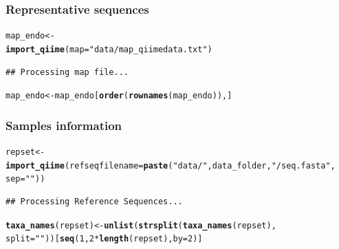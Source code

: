 \documentclass[12pt]{article}\usepackage[]{graphicx}\usepackage[]{color}
\makeatletter
\newcommand{\hlnum}[1]{\textcolor[rgb]{0.686,0.059,0.569}{#1}}%
\newcommand{\hlstr}[1]{\textcolor[rgb]{0.192,0.494,0.8}{#1}}%
\newcommand{\hlopt}[1]{\textcolor[rgb]{0,0,0}{#1}}%
\newcommand{\hlstd}[1]{\textcolor[rgb]{0.345,0.345,0.345}{#1}}%
\newcommand{\hlkwb}[1]{\textcolor[rgb]{0.69,0.353,0.396}{#1}}%
\newcommand{\hlkwc}[1]{\textcolor[rgb]{0.333,0.667,0.333}{#1}}%
\newcommand{\hlkwd}[1]{\textcolor[rgb]{0.737,0.353,0.396}{\textbf{#1}}}%
\newenvironment{kframe}{%
 \def\at@end@of@kframe{}%
 \ifinner\ifhmode%
  \def\at@end@of@kframe{\end{minipage}}%
  \begin{minipage}{\columnwidth}%
 \fi\fi%
 \def\FrameCommand##1{\hskip\@totalleftmargin \hskip-\fboxsep
 \colorbox{shadecolor}{##1}\hskip-\fboxsep
     \hskip-\linewidth \hskip-\@totalleftmargin \hskip\columnwidth}%
 \MakeFramed {\advance\hsize-\width
   \@totalleftmargin\z@ \linewidth\hsize
   \@setminipage}}%
 {\par\unskip\endMakeFramed%
 \at@end@of@kframe}
\newenvironment{knitrout}{}{} %
\numberwithin{figure}{section}
\makeatother
\begin{document}
 \subsubsection{Representative sequences}
\begin{knitrout}\small
{}\color{fgcolor}\begin{kframe}
\begin{alltt}
\hlstd{map_endo} \hlkwb{<-}
  \hlkwd{import_qiime}\hlstd{(}\hlkwc{map} \hlstd{=} \hlstr{"data/map_qiimedata.txt"}\hlstd{)}
\end{alltt}
\begin{verbatim}
## Processing map file...
\end{verbatim}
\begin{alltt}
\hlstd{map_endo} \hlkwb{<-} \hlstd{map_endo[}\hlkwd{order}\hlstd{(}\hlkwd{rownames}\hlstd{(map_endo)),]}
\end{alltt}
\end{kframe}
\end{knitrout}

 \subsubsection{Samples information}
\begin{knitrout}\small
{}\color{fgcolor}\begin{kframe}
\begin{alltt}
\hlstd{repset} \hlkwb{<-} \hlkwd{import_qiime}\hlstd{(}\hlkwc{refseqfilename} \hlstd{=} \hlkwd{paste}\hlstd{(}\hlstr{"data/"}\hlstd{, data_folder,} \hlstr{"/seq.fasta"}\hlstd{,}
                                              \hlkwc{sep} \hlstd{=} \hlstr{""}\hlstd{))}
\end{alltt}
\begin{verbatim}
## Processing Reference Sequences...
\end{verbatim}
\begin{alltt}
\hlkwd{taxa_names}\hlstd{(repset)} \hlkwb{<-} \hlkwd{unlist}\hlstd{(}\hlkwd{strsplit}\hlstd{(}\hlkwd{taxa_names}\hlstd{(repset),}
                                      \hlkwc{split} \hlstd{=} \hlstr{" "}\hlstd{))[}\hlkwd{seq}\hlstd{(}\hlnum{1}\hlstd{,} \hlnum{2}\hlopt{*}\hlkwd{length}\hlstd{(repset),} \hlkwc{by} \hlstd{=} \hlnum{2}\hlstd{)]}
\end{alltt}
\end{kframe}
\end{knitrout}
\end{document}

